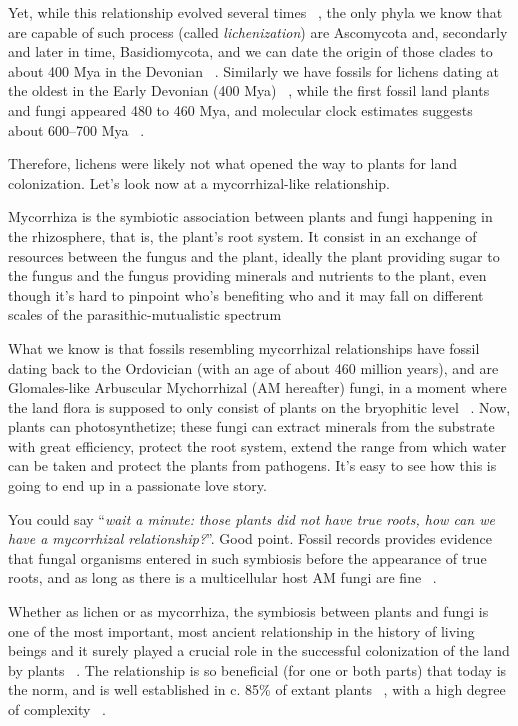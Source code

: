 Yet, while this relationship evolved several times ~\citep{gargas1995}, the only phyla we know that are capable of such process (called \emph{lichenization}) are Ascomycota and, secondarly and later in time, Basidiomycota, and we can date the origin of those clades to about 400 Mya in the Devonian ~\citep{berbee1993}. Similarly we have fossils for lichens dating at the oldest in the Early Devonian (400 Mya) ~\citep{taylor1997, honegger2013}, while the first fossil land plants and fungi appeared 480 to 460 Mya, and molecular clock estimates suggests about 600--700 Mya ~\citep{berbee1993, heckman2001}.

Therefore, lichens were likely not what opened the way to plants for land colonization. Let's look now at a mycorrhizal-like relationship.

Mycorrhiza is the symbiotic association between plants and fungi happening in the rhizosphere, that is, the plant's root system. It consist in an exchange of resources between the fungus and the plant, ideally the plant providing sugar to the fungus and the fungus providing minerals and nutrients to the plant, even though it's hard to pinpoint who's benefiting who and it may fall on different scales of the parasithic-mutualistic spectrum

What we know is that fossils resembling mycorrhizal relationships have fossil dating back to the Ordovician (with an age of about 460 million years), and are Glomales-like Arbuscular Mychorrhizal (AM hereafter) fungi, in a moment where the land flora is supposed to only consist of plants on the bryophitic level ~\citep{redecker2000}. Now, plants can photosynthetize; these fungi can extract minerals from the substrate with great efficiency, protect the root system, extend the range from which water can be taken and protect the plants from pathogens. It's easy to see how this is going to end up in a passionate love story.

You could say ``\emph{wait a minute: those plants did not have true roots, how can we have a mycorrhizal relationship?}''. Good point. Fossil records provides evidence that fungal organisms entered in such symbiosis before the appearance of true roots, and as long as there is a multicellular host AM fungi are fine ~\citep{wang2006, bonfante2008}.

Whether as lichen or as mycorrhiza, the symbiosis between plants and fungi is one of the most important, most ancient relationship in the history of living beings and it surely played a crucial role in the successful colonization of the land by plants ~\citep{pirozynski1975, malloch1980, harley1987, trappe1987, selosse1998, brundrett2002}. The relationship is so beneficial (for one or both parts) that today is the norm, and is well established in c. 85\% of extant plants ~\citep{cairney2000, strullu-derrien2018}, with a high degree of complexity ~\citep{heijden2015}.

